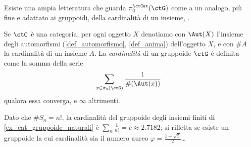 Esiste una ampia letteratura che guarda \(\pi_0^\ctCat(\ctG)\) come a un analogo, più fine e adattato ai gruppoidi, della cardinalità di un insieme, \cite{a,b,c}.
\begin{definition}
	Se \(\ctC\) è una categoria, per ogni oggetto \(X\) denotiamo con \(\Aut(X)\) l'insieme degli automorfismi (\ref{def_automorfismo}, \ref{def_anima}) dell'oggetto \(X\), e con \(\# A\) la cardinalità di un insieme \(A\). La \emph{cardinalità} di un gruppoide \(\ctG\) è definita come la somma della serie
	\[\sum_{x\in \pi_0(\ctG)} \frac 1{\#(\Aut(x))}\]
	qualora essa converga, e \(\infty\) altrimenti.
\end{definition}
Dato che \(\# S_n = n!\), la cardinalità del gruppoide degli insiemi finiti di \ref{ex_cat_gruppoide_naturali} è \(\sum_n \frac 1{n!} = e \approx 2.7182\); si rifletta se esiste un gruppoide la cui cardinalità sia il numero aureo \(\varphi = \frac{1+\sqrt 5}{2}\)\dots
